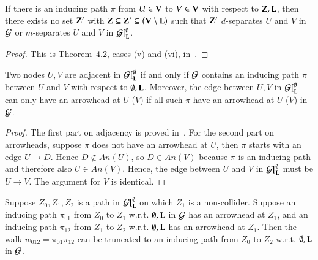 \begin{lemma}
\label{lemma:inducing:nosep}
If there is an inducing path
$\pi$ from $U \in {\bf V}$ to $V \in {\bf V}$ with respect
to  ${\bf Z},{\bf L}$, then there exists no set ${\bf Z}'$ with 
${\bf Z} \subseteq {\bf Z}' \subseteq ({\bf V}\setminus{\bf L})$ 
such that ${\bf Z}'$ $d$-separates $U$ and $V$ in ${\cal G}$ or
$m$-separates $U$ and $V$ in ${\cal G}[^\emptyset_{\bf L}$.
\end{lemma}

\begin{proof}
This is Theorem~4.2, cases (v) and (vi), in~\cite{Richardson2002}.
\end{proof}

\begin{claim}
\label{lemma:inducing:bypass}
Two nodes $U,V$ are 
adjacent in ${\cal G}[^\emptyset_{\bf L}$ if and only if ${\cal G}$ contains 
an inducing path $\pi$ between $U$ and $V$ with respect to $\emptyset,{\bf L}$. 
Moreover, the edge between $U,V$ in  ${\cal G}[^\emptyset_{\bf L}$ 
can only have an arrowhead at 
$U$ ($V$) if all such $\pi$ have
an arrowhead at $U$ ($V$) in ${\cal G}$.
\end{claim}

\begin{proof}
The first part on adjacency is proved in~\citep{Richardson2002}. For the 
second part on arrowheads, suppose $\pi$ does not have an arrowhead at $U$, 
then $\pi$ starts with an edge $U \to D$. Hence $D \notin \textit{An}(U)$, so
$D \in \textit{An}(V)$ because $\pi$ is an inducing path
and therefore also $U \in \textit{An}(V)$. Hence, the edge between $U$ and $V$
in ${\cal G}[^\emptyset_{\bf L}$ must be $U \to V$. The argument for $V$ is identical.
\end{proof}

\begin{claim}
\label{lemma:inducing:concat}
Suppose $Z_0,Z_1,Z_2$ is a path in ${\cal G}[^\emptyset_{\bf L}$ 
on which $Z_1$ is a non-collider. Suppose an
inducing path $\pi_{01}$ from $Z_0$ to $Z_1$ w.r.t. $\emptyset,{\bf L}$ 
in ${\cal G}$ has an arrowhead at $Z_1$, and an
inducing path $\pi_{12}$ from $Z_1$ to $Z_2$ w.r.t. $\emptyset,{\bf L}$ 
has an arrowhead at $Z_1$. Then the walk
$w_{012} = \pi_{01}\pi_{12}$ can be 
truncated to an inducing path from
$Z_0$ to $Z_2$ w.r.t. $\emptyset,{\bf L}$ in ${\cal G}$.
\end{claim}

